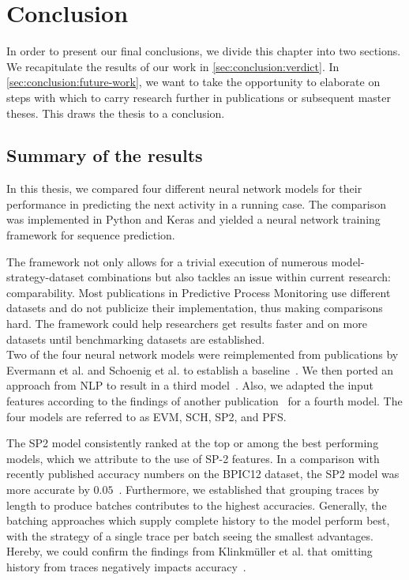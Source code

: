 \chapter{Conclusion} \label{chap:conclusion}
In order to present our final conclusions, we divide this chapter into two sections.
We recapitulate the results of our work in \autoref{sec:conclusion:verdict}.
In \autoref{sec:conclusion:future-work}, we want to take the opportunity to elaborate on steps with which to carry research further in publications or subsequent master theses. This draws the thesis to a conclusion.

\section{Summary of the results} \label{sec:conclusion:verdict}
In this thesis, we compared four different neural network models for their performance in predicting the next activity in a running case. The comparison was implemented in Python and Keras and yielded a neural network training framework for sequence prediction.

The framework not only allows for a trivial execution of numerous model-strategy-dataset combinations but also tackles an issue within current research: comparability. Most publications in Predictive Process Monitoring use different datasets and do not publicize their implementation, thus making comparisons hard. The framework could help researchers get results faster and on more datasets until benchmarking datasets are established.\\

Two of the four neural network models were reimplemented from publications by Evermann et al. and Schoenig et al. to establish a baseline~\cite{evermann2016, schoenig2018}. We then ported an approach from NLP to result in a third model~\cite{shibata2016bipartite}. Also, we adapted the input features according to the findings of another publication~\cite{klinkmuller2018reliablemonitoring} for a fourth model. The four models are referred to as EVM, SCH, SP2, and PFS.

The SP2 model consistently ranked at the top or among the best performing models, which we attribute to the use of SP-2 features. In a comparison with recently published accuracy numbers on the BPIC12 dataset, the SP2 model was more accurate by $0.05$~\cite{boehmer2018probability, evermann2016}. Furthermore, we established that grouping traces by length to produce batches contributes to the highest accuracies. Generally, the batching approaches which supply complete history to the model perform best, with the strategy of a single trace per batch seeing the smallest advantages. Hereby, we could confirm the findings from Klinkmüller et al. that omitting history from traces negatively impacts accuracy~\cite{klinkmuller2018reliablemonitoring}.

